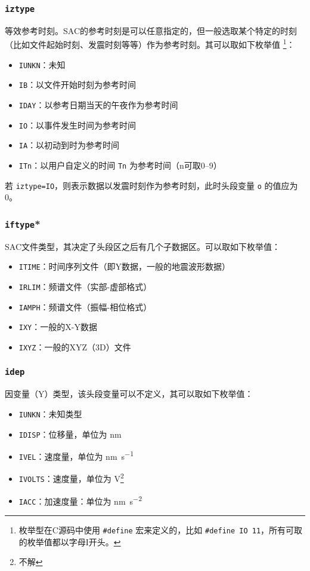 \subsubsection{\texttt{iztype}}
等效参考时刻。SAC的参考时刻是可以任意指定的，但一般选取某个特定的时刻
（比如文件起始时刻、发震时刻等等）作为参考时刻。其可以取如下枚举值
\footnote{枚举型在C源码中使用 \verb|#define| 宏来定义的，比如
\verb|#define IO 11|，所有可取的枚举值都以字母I开头。}：
\begin{itemize}
\item \texttt{IUNKN}：未知
\item \texttt{IB}：以文件开始时刻为参考时间
\item \texttt{IDAY}：以参考日期当天的午夜作为参考时间
\item \texttt{IO}：以事件发生时间为参考时间
\item \texttt{IA}：以初动到时为参考时间
\item \texttt{ITn}：以用户自定义的时间 \texttt{Tn} 为参考时间（n可取0--9）
\end{itemize}

若 \texttt{iztype=IO}，则表示数据以发震时刻作为参考时刻，此时头段变量
\texttt{o} 的值应为0。

\subsubsection{\texttt{iftype}*}
SAC文件类型，其决定了头段区之后有几个子数据区。可以取如下枚举值：
\begin{itemize}
\item \texttt{ITIME}：时间序列文件（即Y数据，一般的地震波形数据）
\item \texttt{IRLIM}：频谱文件（实部-虚部格式）
\item \texttt{IAMPH}：频谱文件（振幅-相位格式）
\item \texttt{IXY}：一般的X-Y数据
\item \texttt{IXYZ}：一般的XYZ（3D）文件
\end{itemize}

\subsubsection{\texttt{idep}}
因变量（Y）类型，该头段变量可以不定义，其可以取如下枚举值：
\begin{itemize}
\item \texttt{IUNKN}：未知类型
\item \texttt{IDISP}：位移量，单位为 \si{\nm}
\item \texttt{IVEL}：速度量，单位为 \si{\nm\per\s}
\item \texttt{IVOLTS}：速度量，单位为 \si{\V}\footnote{不解}
\item \texttt{IACC}：加速度量：单位为 \si{\nm\per\square\s}
\end{itemize}

